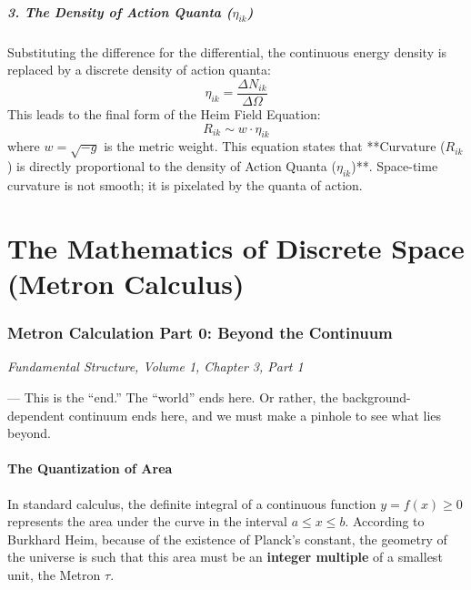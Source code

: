 \documentclass[11pt,a4paper,oneside]{article}
\begin{document}
\subsubsection*{3. The Density of Action Quanta ($\eta_{ik}$)}
Substituting the difference for the differential, the continuous energy density is replaced by a discrete density of action quanta:
\begin{equation}
    \eta_{ik} = \frac{\Delta N_{ik}}{\Delta \Omega}
\end{equation}
This leads to the final form of the Heim Field Equation:
\begin{equation}
    R_{ik} \sim w \cdot \eta_{ik}
\end{equation}
where $w = \sqrt{-g}$ is the metric weight. This equation states that **Curvature ($R_{ik}$) is directly proportional to the density of Action Quanta ($\eta_{ik}$)**. Space-time curvature is not smooth; it is pixelated by the quanta of action. 
\clearpage
\part{The Mathematics of Discrete Space (Metron Calculus)}

\section{Metron Calculation Part 0: Beyond the Continuum}
\textit{Fundamental Structure, Volume 1, Chapter 3, Part 1}

--- This is the ``end.'' The ``world'' ends here. Or rather, the background-dependent continuum ends here, and we must make a pinhole to see what lies beyond.

\subsection{The Quantization of Area}

In standard calculus, the definite integral of a continuous function $y = f(x) \geq 0$ represents the area under the curve in the interval $a \leq x \leq b$. According to Burkhard Heim, because of the existence of Planck's constant, the geometry of the universe is such that this area must be an \textbf{integer multiple} of a smallest unit, the Metron $\tau$.
\end{document}
